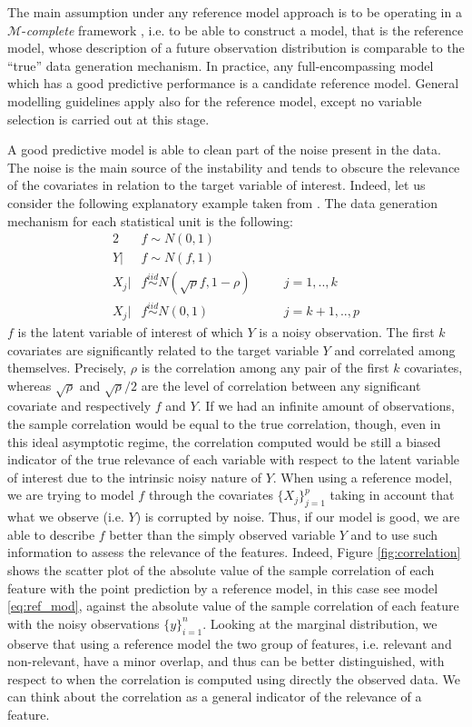 \documentclass[american,]{article}
\theoremstyle{definition}
\begin{document}
The main assumption under any reference model approach is to be operating in a $\mathcal{M}$-\textit{complete} framework \citep{book:bernardo_smith,vehtari2012survey}, i.e. to be able to construct a model, that is the reference model, whose description of a future observation distribution is comparable to the ``true'' data generation mechanism. In practice, any full-encompassing model which has a good predictive performance is a candidate reference model. General modelling guidelines apply also for the reference model, except no variable selection is carried out at this stage.
 
A good predictive model is able to clean part of the noise present in the data. The noise is the main source of the instability and tends to obscure the relevance of the covariates in relation to the target variable of interest. Indeed, let us consider the following explanatory example taken from \cite{paper:projpred}. The data generation mechanism for each statistical unit is the following:
\
\begin{alignat}{2} \label{eq:simulated_data}
     &f\sim N(0,1) && \nonumber \\ 
     Y|&f\sim N(f,1) && \\
     X_{j}|&f \overset{iid}{\sim} N(\sqrt{\rho}f,1-\rho) \quad &&j=1,..,k \nonumber \\
     X_{j}|&f \overset{iid}{\sim} N(0,1) &&j=k+1,..,p \nonumber
\end{alignat}
$f$ is the latent variable of interest of which $Y$ is a noisy observation. The first $k$ covariates are significantly related to the target variable $Y$ and correlated among themselves. Precisely, $\rho$ is the correlation among any pair of the first $k$ covariates, whereas $\sqrt{\rho}$ and $\sqrt{\rho}/2$ are the level of correlation between any significant covariate and respectively $f$ and $Y$. If we had an infinite amount of observations, the sample correlation would be equal to the true correlation, though, even in this ideal asymptotic regime, the correlation computed would be still a biased indicator of the true relevance of each variable with respect to the latent variable of interest due to the intrinsic noisy nature of $Y$. When using a reference model, we are trying to model $f$ through the covariates $\{X_{j}\}_{j=1}^{p}$ taking in account that what we observe (i.e. $Y$) is corrupted by noise. Thus, if our model is good, we are able to describe $f$ better than the simply observed variable $Y$ and to use such information to assess the relevance of the features. Indeed, Figure \ref{fig:correlation} shows the scatter plot of the absolute value of the sample correlation of each feature with the point prediction by a reference model, in this case see model \eqref{eq:ref_mod}, against the absolute value of the sample correlation of each feature with the noisy observations $\{y\}_{i=1}^{n}$. Looking at the marginal distribution, we observe that using a reference model the two group of features, i.e. relevant and non-relevant, have a minor overlap, and thus can be better distinguished, with respect to when the correlation is computed using directly the observed data. We can think about the correlation as a general indicator of the relevance of a feature.  
\end{document}
